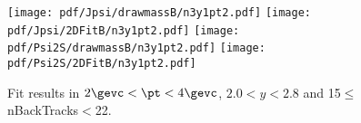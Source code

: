 \begin{figure}[H]
\begin{center}
\texttt{[image: pdf/Jpsi/drawmassB/n3y1pt2.pdf]}
\texttt{[image: pdf/Jpsi/2DFitB/n3y1pt2.pdf]}
\vspace*{-0.5cm}
\texttt{[image: pdf/Psi2S/drawmassB/n3y1pt2.pdf]}
\texttt{[image: pdf/Psi2S/2DFitB/n3y1pt2.pdf]}
\vspace*{-0.5cm}
\end{center}
\caption{Fit results in $2\gevc<\pt<4\gevc$, $2.0<y<2.8$ and 15$\leq$nBackTracks$<$22.}
\label{Fitn3y1pt2}
\end{figure}
